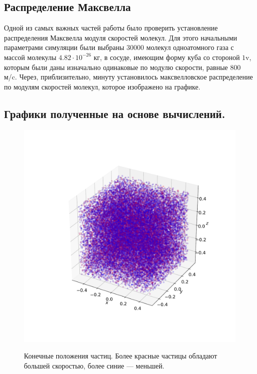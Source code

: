 \documentclass[twoside,twocolumn, 11pt]{article}
\theoremstyle{plain}
\theoremstyle{definition}
\begin{document}
\subsection{Распределение Максвелла}

\indent Одной из самых важных частей работы было проверить установление распределения Максвелла модуля скоростей молекул. Для этого начальными параметрами симуляции были выбраны 30000 молекул одноатомного газа с массой молекулы $4.82 \cdot 10^{-26}$ кг, в сосуде, имеющим форму куба со стороной $1$v, которым были даны изначально одинаковые по модулю скорости, равные $800$ м/c. Через, приблизительно, минуту установилось максвелловское распределение по модулям скоростей молекул, которое изображено на графике.\\

\subsection{Графики полученные на основе вычислений.}
\begin{figure}[!h]
    {\includegraphics[width=1\linewidth]{particles}}
    \caption{Конечные положения частиц. Более красные частицы обладают большей скоростью, более синие — меньшей.}
    \end{figure}
\end{document}
